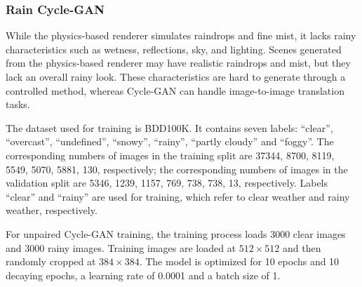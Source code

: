 \documentclass[10pt,letterpaper]{article}
\begin{document}
\subsubsection{Rain Cycle-GAN}
\label{sec:section-rain-gan}

While the physics-based renderer simulates raindrops and fine mist, it lacks rainy characteristics 
such as wetness, reflections, sky, and lighting. Scenes generated from the physics-based renderer 
may have realistic raindrops and mist, but they lack an overall rainy look. These characteristics 
are hard to generate through a controlled method, whereas Cycle-GAN can handle image-to-image translation 
tasks.

The dataset used for training is BDD100K. It contains seven labels: “clear”, “overcast”, “undefined”, 
“snowy”, “rainy”, “partly cloudy” and “foggy”. The corresponding numbers of images in the training split are 
37344, 8700, 8119, 5549, 5070, 5881, 130, respectively; the corresponding numbers of images in the validation 
split are 5346, 1239, 1157, 769, 738, 738, 13, respectively. Labels “clear” and “rainy” are used for 
training, which refer to clear weather and rainy weather, respectively. 

For unpaired Cycle-GAN training, the training process loads 3000 clear images and 3000 rainy
images. Training images are loaded at $512\times512$ and then randomly cropped at $384\times384$. The model 
is optimized for 10 epochs and 10 decaying epochs, a learning rate of 0.0001 and a batch size of 1. 
\end{document}
